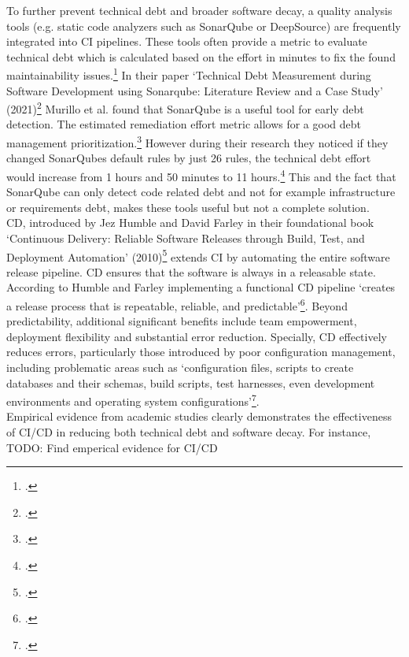 To further prevent technical debt and broader software decay, a quality analysis tools (e.g. static code analyzers such as SonarQube or DeepSource) are frequently integrated into
\ac{CI} pipelines. These tools often provide a metric to evaluate technical debt which is calculated based on the effort in minutes to fix the found maintainability issues.\footcite{UnderstandingMeasuresMetrics}
In their paper `Technical Debt Measurement during Software Development using Sonarqube: Literature Review and a Case Study' (2021)\footcite{murilloTechnicalDebtMeasurement2021}
Murillo et al. found that SonarQube is a useful tool for early debt detection. The estimated remediation effort metric allows for a good debt management prioritization.\footcite[5]{murilloTechnicalDebtMeasurement2021}
However during their research they noticed if they changed SonarQubes default rules by just 26 rules, the technical debt effort would increase from
1 hours and 50 minutes to 11 hours.\footcite[4]{murilloTechnicalDebtMeasurement2021} This and the fact that SonarQube can only detect code related debt and not for example
infrastructure or requirements debt, makes these tools useful but not a complete solution.\\

\ac{CD}, introduced by Jez Humble and David Farley in their foundational book `Continuous Delivery: Reliable Software Releases through Build, Test, and Deployment Automation' (2010)\footcite{humbleContinuousDeliveryReliable2010}
extends \ac{CI} by automating the entire software release pipeline. \ac{CD} ensures that the software is always in a releasable state.
According to Humble and Farley implementing a functional \ac{CD} pipeline `creates a release process that is repeatable, reliable, and predictable'\footcite[17]{humbleContinuousDeliveryReliable2010}.
Beyond predictability, additional significant benefits include team empowerment, deployment flexibility and substantial error reduction.
Specially, \ac{CD} effectively reduces errors, particularly those introduced by poor configuration management, including problematic areas such as
`configuration files, scripts to create databases and their schemas, build scripts, test harnesses, even development environments and operating system configurations'\footcite[19]{humbleContinuousDeliveryReliable2010}.\\

Empirical evidence from academic studies clearly demonstrates the effectiveness of \ac{CI/CD} in reducing both technical debt and software decay.
For instance, 
TODO: Find emperical evidence for CI/CD\\
